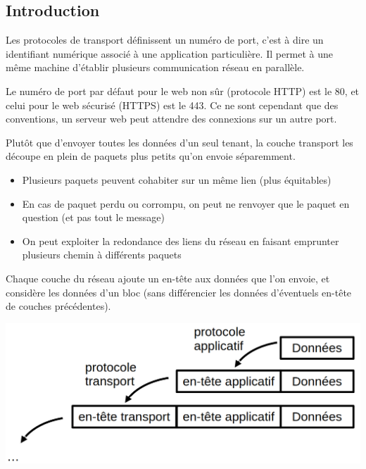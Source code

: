 \subsection{Introduction}

\begin{definition}
	Les protocoles de transport définissent un numéro de port, c'est à dire un identifiant numérique associé à une application particulière. Il permet à une même machine d'établir plusieurs communication réseau en parallèle.
\end{definition}

\begin{example}
	Le numéro de port par défaut pour le web non sûr (protocole HTTP) est le 80, et celui pour le web sécurisé (HTTPS) est le 443. Ce ne sont cependant que des conventions, un serveur web peut attendre des connexions sur un autre port.
\end{example}

\begin{principe}
	Plutôt que d'envoyer toutes les données d'un seul tenant, la couche transport les découpe en plein de paquets plus petits qu'on envoie séparemment.\end{principe}
\begin{personalise}[Intérêts] \begin{itemize}[label=$\star$]
		\item Plusieurs paquets peuvent cohabiter sur un même lien (plus équitables)
		\item En cas de paquet perdu ou corrompu, on peut ne renvoyer que le paquet en question (et pas tout le message)
		\item On peut exploiter la redondance des liens du réseau en faisant emprunter plusieurs chemin à différents paquets
	\end{itemize}
\end{personalise}

\begin{principe}
	Chaque couche du réseau ajoute un en-tête aux données que l'on envoie, et considère les données d'un bloc (sans différencier les données d'éventuels en-tête de couches précédentes).\begin{center}
		\includegraphics[width=0.6\linewidth]{lecon/25-client-serveur/encapsulation.png}
	\end{center}
\end{principe}

